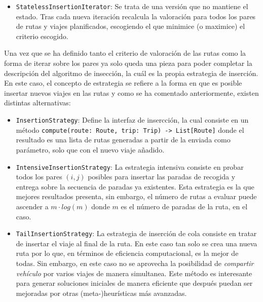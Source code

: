\documentclass{subfiles}
\begin{document}
\begin{itemize}
\begin{itemize}
                      \item \texttt{StatelessInsertionIterator}: Se trata de una versión que no mantiene el estado. Tras cada nueva iteración recalcula la valoración para todos los pares de rutas y viajes planificados, escogiendo el que minimice (o maximice) el criterio escogido.

                  \end{itemize}

                  Una vez que se ha definido tanto el criterio de valoración de las rutas como la forma de iterar sobre los pares ya solo queda una pieza para poder completar la descripción del algoritmo de insección, la cuál es la propia estrategia de inserción. En este caso, el concepto de estrategia se refiere a la forma en que es posible insertar nuevos viajes en las rutas y como se ha comentado anteriormente, existen distintas alternativas:

                  \begin{itemize}

                      \item \texttt{InsertionStrategy}: Define la interfaz de insercción, la cual consiste en un método \verb|compute(route: Route, trip: Trip) -> List[Route]| donde el resultado es una lista de rutas generadas a partir de la enviada como parámetro, solo que con el nuevo viaje añadido.

                      \item \texttt{IntensiveInsertionStrategy}: La estrategia intensiva consiste en probar todos los pares $(i, j)$ posibles para insertar las paradas de recogida y entrega sobre la secuencia de paradas ya existentes. Esta estrategia es la que mejores resultados presenta, sin embargo, el número de rutas a evaluar puede ascender a $m \cdot log(m)$ donde $m$ es el número de paradas de la ruta, en el  caso.

                      \item \texttt{TailInsertionStrategy}: La estrategia de inserción de cola consiste en tratar de insertar el viaje al final de la ruta. En este caso tan solo se crea una nueva ruta por lo que, en términos de eficiencia computacional, es la mejor de todas. Sin embargo, en este caso no se aprovecha la posibilidad de \emph{compartir vehículo} por varios viajes de manera simultanea. Este método es interesante para generar soluciones iniciales de manera eficiente que después puedan ser mejoradas por otras (meta-)heurísticas más avanzadas.


\end{itemize}
\end{itemize}
\end{document}
